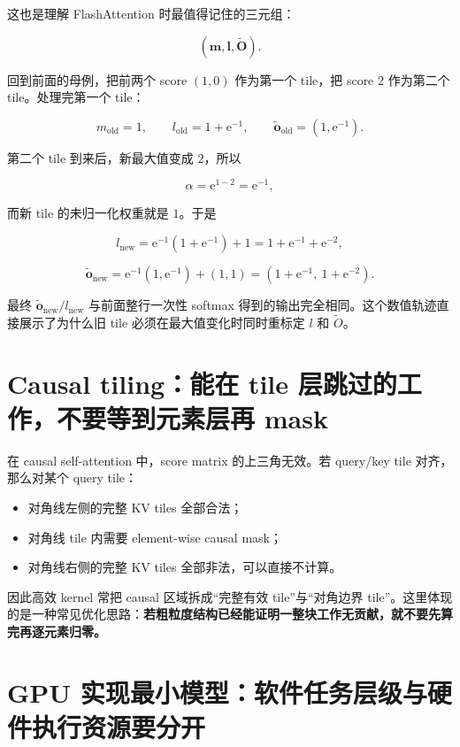 \documentclass[profile=standard,twoside=false]{ipara-handbook}
\begin{document}
这也是理解 FlashAttention 时最值得记住的三元组：

$$
\boxed{(\boldsymbol{m},\boldsymbol{l},\widetilde{\boldsymbol{O}})}.
$$

回到前面的母例，把前两个 score $(1,0)$ 作为第一个 tile，把 score $2$ 作为第二个 tile。处理完第一个 tile：

$$
m_{\mathrm{old}}=1,\qquad
l_{\mathrm{old}}=1+\mathrm{e}^{-1},\qquad
\widetilde{\boldsymbol{o}}_{\mathrm{old}}=(1,\mathrm{e}^{-1}).
$$

第二个 tile 到来后，新最大值变成 $2$，所以

$$
\alpha=\mathrm{e}^{1-2}=\mathrm{e}^{-1},
$$

而新 tile 的未归一化权重就是 $1$。于是

$$
l_{\mathrm{new}}
=\mathrm{e}^{-1}(1+\mathrm{e}^{-1})+1
=1+\mathrm{e}^{-1}+\mathrm{e}^{-2},
$$

$$
\widetilde{\boldsymbol{o}}_{\mathrm{new}}
=\mathrm{e}^{-1}(1,\mathrm{e}^{-1})+(1,1)
=(1+\mathrm{e}^{-1},\ 1+\mathrm{e}^{-2}).
$$

最终 $\widetilde{\boldsymbol{o}}_{\mathrm{new}}/l_{\mathrm{new}}$ 与前面整行一次性 softmax 得到的输出完全相同。这个数值轨迹直接展示了为什么旧 tile 必须在最大值变化时同时重标定 $l$ 和 $\widetilde O$。

\section{Causal tiling：能在 tile 层跳过的工作，不要等到元素层再 mask}

在 causal self-attention 中，score matrix 的上三角无效。若 query/key tile 对齐，那么对某个 query tile：

\begin{itemize}
  \item 对角线左侧的完整 KV tiles 全部合法；
  \item 对角线 tile 内需要 element-wise causal mask；
  \item 对角线右侧的完整 KV tiles 全部非法，可以直接不计算。
\end{itemize}

因此高效 kernel 常把 causal 区域拆成“完整有效 tile”与“对角边界 tile”。这里体现的是一种常见优化思路：\textbf{若粗粒度结构已经能证明一整块工作无贡献，就不要先算完再逐元素归零。}

\section{GPU 实现最小模型：软件任务层级与硬件执行资源要分开}
\end{document}
